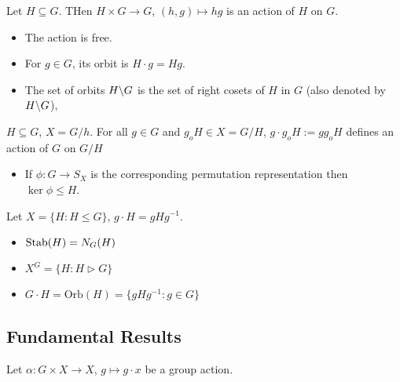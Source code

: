 \documentclass{article}
\begin{document}
\begin{example}
    Let $H\subseteq G$. THen $H\times G\rightarrow G$, $(h,g)\mapsto hg$ is an action of $H$ on $G$.
    \begin{itemize}
        \item The action is free.
        \item For $g\in G$, its orbit is $H\cdot g=Hg$.
        \item The set of orbits $H \text{\textbackslash} G$ is the set of right cosets of $H$ in $G$ (also denoted by $H\text{\textbackslash} G$),
    \end{itemize}
\end{example}
\begin{example}
    $H\subseteq G$, $X=G/h$. For all $g\in G$ and $g_o H\in X = G/H$, $g\cdot g_o H := gg_oH$ defines an action of $G$ on $G/H$
    \begin{itemize}
        \item If $\phi:G\rightarrow S_X$ is the corresponding permutation representation then $\ker\phi \le H$.
    \end{itemize}
\end{example}
\begin{example}
    Let $X=\{H:H\le G\}$, $g\cdot H=gHg^{-1}$.
    \begin{itemize}
        \item $\operatorname{Stab}(H)=N_G(H)$
        \item $X^G=\{H:H\triangleright G\}$
        \item $G\cdot H =\text{Orb}(H) = \{gHg^{-1}:g\in G\}$
    \end{itemize}
\end{example}
\subsection{Fundamental Results}
Let $\alpha:G\times X\rightarrow X$, $g\mapsto g\cdot x$ be a group action.
\end{document}
